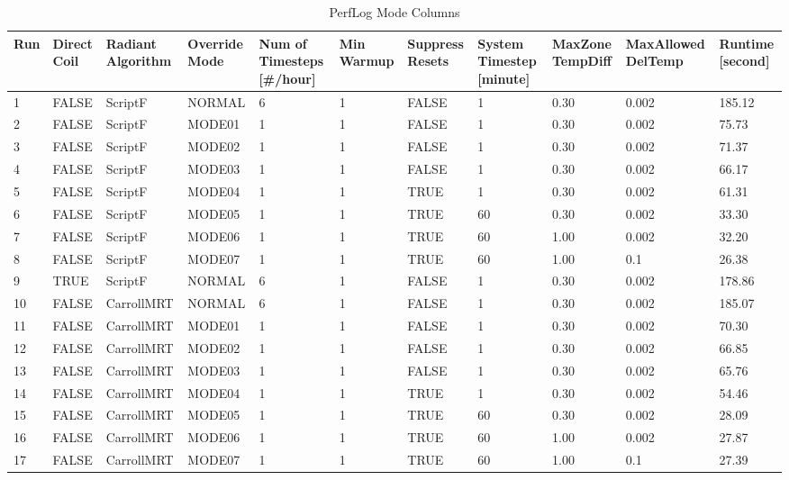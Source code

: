 {\scriptsize
\begin{longtable}[c]{p{0.2in}p{0.4in}p{0.55in}p{0.5in}p{0.52in}p{0.4in}p{0.5in}p{0.5in}p{0.5in}p{0.6in}p{0.5in}}
\caption{PerfLog Mode Columns\label{table:perflog_mode_columns}} \tabularnewline
\toprule
Run &
Direct Coil &
Radiant Algorithm &
Override Mode &
Num of Timesteps {[}\#/hour{]}&
Min Warmup&
Suppress Resets &
System Timestep {[}minute{]} &
MaxZone TempDiff &
MaxAllowed DelTemp &
Runtime {[}second{]} \tabularnewline
\midrule
\endfirsthead

1  & FALSE & ScriptF    & NORMAL & 6 & 1 & FALSE & 1  & 0.30 & 0.002 & 185.12 \tabularnewline
2  & FALSE & ScriptF    & MODE01 & 1 & 1 & FALSE & 1  & 0.30 & 0.002 & 75.73  \tabularnewline
3  & FALSE & ScriptF    & MODE02 & 1 & 1 & FALSE & 1  & 0.30 & 0.002 & 71.37  \tabularnewline
4  & FALSE & ScriptF    & MODE03 & 1 & 1 & FALSE & 1  & 0.30 & 0.002 & 66.17  \tabularnewline
5  & FALSE & ScriptF    & MODE04 & 1 & 1 & TRUE  & 1  & 0.30 & 0.002 & 61.31  \tabularnewline
6  & FALSE & ScriptF    & MODE05 & 1 & 1 & TRUE  & 60 & 0.30 & 0.002 & 33.30  \tabularnewline
7  & FALSE & ScriptF    & MODE06 & 1 & 1 & TRUE  & 60 & 1.00 & 0.002 & 32.20  \tabularnewline
8  & FALSE & ScriptF    & MODE07 & 1 & 1 & TRUE  & 60 & 1.00 & 0.1   & 26.38  \tabularnewline
9  & TRUE  & ScriptF    & NORMAL & 6 & 1 & FALSE & 1  & 0.30 & 0.002 & 178.86 \tabularnewline
10 & FALSE & CarrollMRT & NORMAL & 6 & 1 & FALSE & 1  & 0.30 & 0.002 & 185.07 \tabularnewline
11 & FALSE & CarrollMRT & MODE01 & 1 & 1 & FALSE & 1  & 0.30 & 0.002 & 70.30  \tabularnewline
12 & FALSE & CarrollMRT & MODE02 & 1 & 1 & FALSE & 1  & 0.30 & 0.002 & 66.85  \tabularnewline
13 & FALSE & CarrollMRT & MODE03 & 1 & 1 & FALSE & 1  & 0.30 & 0.002 & 65.76  \tabularnewline
14 & FALSE & CarrollMRT & MODE04 & 1 & 1 & TRUE  & 1  & 0.30 & 0.002 & 54.46  \tabularnewline
15 & FALSE & CarrollMRT & MODE05 & 1 & 1 & TRUE  & 60 & 0.30 & 0.002 & 28.09  \tabularnewline
16 & FALSE & CarrollMRT & MODE06 & 1 & 1 & TRUE  & 60 & 1.00 & 0.002 & 27.87  \tabularnewline
17 & FALSE & CarrollMRT & MODE07 & 1 & 1 & TRUE  & 60 & 1.00 & 0.1   & 27.39  \tabularnewline

\bottomrule
\end{longtable}
}


